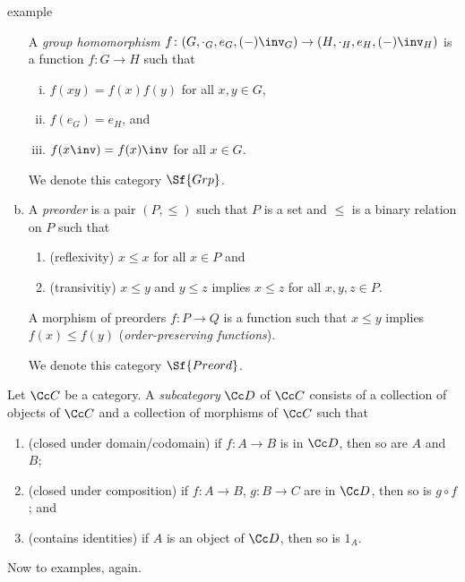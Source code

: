 \documentclass[class=article, crop=false]{standalone}
\begin{document}
\begin{understandingcheck}{example}
\begin{enumerate}[(a)]
      A \emph{group homomorphism} $f\colon (G, \cdot_G, e_G, (-)\inv_G) \to (H, \cdot_H, e_H, (-)\inv_H)$ is a function $f\colon G \to H$ such that
        \begin{enumerate}[(i)]
          \item $f(xy) = f(x)f(y)$ for all $x,y \in G$,
          \item $f(e_G)=e_H$, and
          \item $f(x\inv) = f(x)\inv$ for all $x \in G$.
        \end{enumerate}

      We denote this category $\Sf{Grp}$.

    \item
      A \emph{preorder} is a pair $(P,\leq)$ such that $P$ is a set and $\leq$ is a binary relation on $P$ such that
        \begin{enumerate}[(P1)]
          \item (reflexivity) $x \leq x$ for all $x \in P$ and
          \item (transivitiy) $x \leq y$ and $y \leq z$ implies $x \leq z$ for all $x,y,z \in P$.
        \end{enumerate}
      A morphism of preorders $f\colon P \to Q$ is a function such that $x \leq y$ implies $f(x) \leq f(y)$ (\emph{order-preserving functions}).

      We denote this category $\Sf{Preord}$.
  \end{enumerate}
\end{understandingcheck}

\begin{defn}
  Let $\Cc C$ be a category. A \emph{subcategory} $\Cc D$ of $\Cc C$ consists of a collection of objects of $\Cc C$ and a collection of morphisms of $\Cc C$ such that
    \begin{enumerate}[(1)]
      \item (closed under domain/codomain) if $f\colon A \to B$ is in $\Cc D$, then so are $A$ and $B$;
      \item (closed under composition) if $f\colon A \to B$, $g\colon B \to C$ are in $\Cc D$, then so is $g \circ f$; and
      \item (contains identities) if $A$ is an object of $\Cc D$, then so is $1_A$.
    \end{enumerate}
\end{defn}

Now to examples, again.
\end{document}
